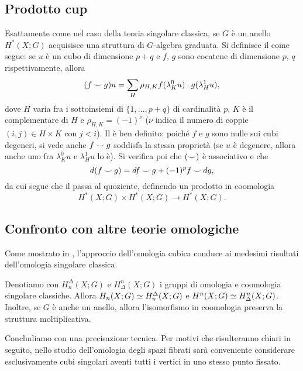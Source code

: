 \subsection{Prodotto cup}\label{cubic-homology:cup-product}
Esattamente come nel caso della teoria singolare classica, se \(G\) è un anello \(H^*(X;G)\) acquisisce una struttura di \(G\)-algebra graduata. Si definisce il \cupproduct{} come segue: se \(u\) è un cubo di dimensione \(p+q\) e \(f\), \(g\) sono cocatene di dimensione \(p\), \(q\) rispettivamente, allora
\[
(f\mathbin{\smile} g)u=\sum_H\rho_{H,K}f(\lambda^0_Ku)\cdot g(\lambda^1_Hu),
\]
dove \(H\) varia fra i sottoinsiemi di \(\{1,\ldots,p+q\}\) di cardinalità \(p\), \(K\) è il complementare di \(H\) e \(\rho_{H,K}=(-1)^\nu\) (\(\nu\) indica il numero di coppie \((i,j)\in H\times K\) con \(j<i\)). Il \cupproduct{} è ben definito: poiché \(f\) e \(g\) sono nulle sui cubi degeneri, si vede anche \(f\mathbin{\smile} g\) soddisfa la stessa proprietà (se \(u\) è degenere, allora anche uno fra \(\lambda^0_Ku\) e \(\lambda^1_Hu\) lo è). Si verifica poi che \((\mathbin{\smile})\) è associativo e che
\[
d(f\mathbin{\smile} g)=df\mathbin{\smile} g+(-1)^pf\mathbin{\smile} dg,
\]
da cui segue che il \cupproduct{} passa al quoziente, definendo un prodotto in coomologia 
\[
H^*(X;G)\times H^*(X;G)\longrightarrow H^*(X;G).
\]

\subsection{Confronto con altre teorie omologiche}\label{cubic-homology:comparison}
Come mostrato in , l'approccio dell'omologia cubica conduce ai medesimi risultati dell'omologia singolare classica.

\begin{theorem}
Denotiamo con \(H_n^\Delta(X;G)\) e \(H^n_\Delta(X;G)\) i gruppi di omologia e coomologia singolare classiche. Allora \(H_n(X;G)\simeq H_n^\Delta(X;G)\) e \(H^n(X;G)\simeq H_\Delta^n(X;G)\). Inoltre, se \(G\) è anche un anello, allora l'isomorfismo in coomologia preserva la struttura moltiplicativa.
\end{theorem}

Concludiamo con una precisazione tecnica. Per motivi che risulteranno chiari in seguito, nello studio dell'omologia degli spazi fibrati sarà conveniente considerare esclusivamente cubi singolari aventi tutti i vertici in uno stesso punto fissato.

